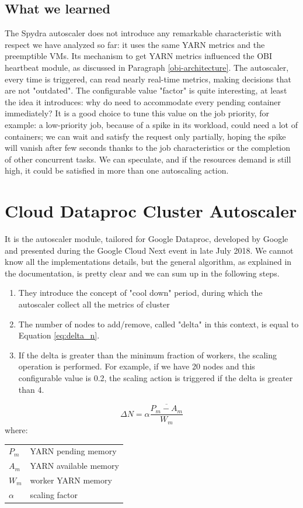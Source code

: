 \documentclass[12pt,twoside,cucitura]{toptesi}
\makeatletter
\newenvironment{conditions}
  {\par\vspace{\abovedisplayskip}\noindent\begin{tabular}{>{$}l<{$} @{${}={}$} l}}
  {\end{tabular}\par\vspace{\belowdisplayskip}}
\makeatother
\begin{document}
\subsection{What we learned}
The Spydra autoscaler does not introduce any remarkable characteristic with respect we have analyzed so far: it uses the same YARN metrics and the preemptible VMs. Its mechanism to get YARN metrics influenced the OBI heartbeat module, as discussed in Paragraph \ref{obi-architecture}. The autoscaler, every time is triggered, can read nearly real-time metrics, making decisions that are not "outdated". The configurable value "factor" is quite interesting, at least the idea it introduces: why do need to accommodate every pending container immediately? It is a good choice to tune this value on the job priority, for example: a low-priority job, because of a spike in its workload, could need a lot of containers; we can wait and satisfy the request only partially, hoping the spike will vanish after few seconds thanks to the job characteristics or the completion of other concurrent tasks. We can speculate, and if the resources demand is still high, it could be satisfied in more than one autoscaling action.

\section{Cloud Dataproc Cluster Autoscaler}
It is the autoscaler module, tailored for Google Dataproc, developed by Google \cite{google_autoscaler} and presented during the Google Cloud Next event in late July 2018. We cannot know all the implementations details, but the general algorithm, as explained in the documentation, is pretty clear and we can sum up in the following steps. 
\begin{enumerate}
	\item They introduce the concept of "cool down" period, during which the autoscaler collect all the metrics of cluster
	\item The number of nodes to add/remove, called "delta" in this context, is equal to Equation \ref{eq:delta_n}.
	\item If the delta is greater than the minimum fraction of workers, the scaling operation is performed. For example, if we have 20 nodes and this configurable value is 0.2, the scaling action is triggered if the delta is greater than 4.
\end{enumerate}

\begin{equation} \label{eq:delta_n}
\Delta N = \alpha\frac{\overline{P_{m} - A_{m}}}{W_{m}}  
\end{equation}
where:
\begin{conditions}
 P_{m}     &  YARN pending memory \\
 A_{m}    &  YARN available memory \\   
W_{m} &  worker YARN memory \\
 \alpha & scaling factor
\end{conditions}
\end{document}

